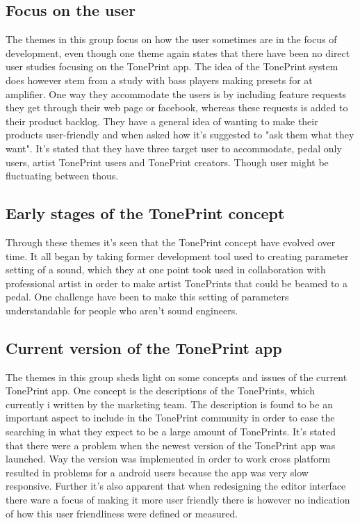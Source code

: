 \subsection*{Focus on the user}
The themes in this group focus on how the user sometimes are in the focus of development, even though one theme again states that there have been no direct user studies focusing on the TonePrint app. The idea of the TonePrint system does however stem from a study with bass players making presets for at amplifier. One way they accommodate the users is by including feature requests they get through their web page or facebook, whereas these requests is added to their product backlog. They have a general idea of wanting to make their products user-friendly and when asked how it's suggested to "ask them what they want". It's stated that they have three target user to accommodate, pedal only users, artist TonePrint users and TonePrint creators. Though user might be fluctuating between thous.

\subsection*{Early stages of the TonePrint concept}
Through these themes it's seen that the TonePrint concept have evolved over time. It all began by taking former development tool used to creating parameter setting of a sound, which they at one point took used in collaboration with professional artist in order to make artist TonePrints that could be beamed to a pedal. One challenge have been to make this setting of parameters understandable for people who aren't sound engineers.

\subsection*{Current version of the TonePrint app}
The themes in this group sheds light on some concepts and issues of the current TonePrint app. One concept is the descriptions of the TonePrints, which currently i written by the marketing team. The description is found to be an important aspect to include in the TonePrint community in order to ease the searching in what they expect to be a large amount of TonePrints. It's stated that there were a problem when the newest version of the TonePrint app was launched. Way the version was implemented in order to work cross platform resulted in problems for a android users because the app was very slow responsive. Further it's also apparent that when redesigning the editor interface there ware a focus of making it more user friendly there is however no indication of how this user friendliness were defined or measured.


